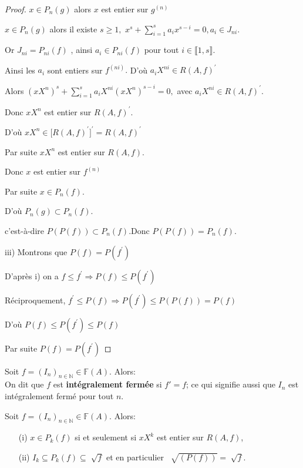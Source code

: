 \begin{proof}
	$x\in P_{n}(g)$ alors $x$ est entier sur $g^{(n)}$
	
	$x\in P_{n}(g)$ alors il existe $s\geq 1,$ $x^{s}+\sum\limits_{i=1}^{s}a_{i}x^{s-i}=0,a_{i}\in J_{ni}$.
	
	Or $J_{ni}=P_{ni}(f)$ , ainsi $a_{i}\in P_{ni}(f)$ pour tout $i\in \llbracket 1, s \rrbracket.$
	
	Ainsi les $a_{i}$ sont entiers sur $f^{(ni)}.$ D'où $a_{i}X^{ni}\in R(A,f)^{\prime }$
	
	Alors $(xX^{n})^{s}+\sum\limits_{i=1}^{s}a_{i}X^{ni}(xX^{n})^{s-i}=0,$ avec 
	$a_{i}X^{ni}\in R(A,f)^{\prime }$.
	
	Donc $xX^{n}$ est entier sur $R(A,f)^{\prime }$.
	
	D'où $xX^{n}\in \lbrack R(A,f)^{\prime }]^{\prime }=R(A,f)^{\prime }$
	
	Par suite $xX^{n}$ est entier sur $R(A,f)$.
	
	Donc $x$ est entier sur $f^{(n)}$
	
	Par suite $x\in P_{n}(f).$
	
	D'où $P_{n}(g)\subset P_{n}(f).$
	
	c'est-\`{a}-dire $P(P(f))\subset P_{n}(f).$Donc $P(P(f))=P_{n}(f).$
	
	
	
	iii) Montrons que $P(f)=P(f^{\prime })$
	
	D'après i) on a $f\leq f^{\prime }\Rightarrow P(f)\leq P(f^{\prime })$
	
	Réciproquement, $f^{\prime }\leq P(f)\Rightarrow P(f^{\prime })\leq
	P(P(f))=P(f)$
	
	D'où $P(f)\leq P(f^{\prime })\leq P(f)$
	
	Par suite $P(f)=P(f^{\prime })$
\end{proof}
\begin{madefinition}
Soit $f=(I_n)_{n \in \mathbb{N}} \in \mathbb{F}(A)$. Alors:\\
On dit que $f$ est \textbf{intégralement fermée} si $f'=f$; ce qui signifie aussi que $I_n$ est intégralement fermé pour tout $n$.
\end{madefinition}
\begin{maproposition}
	Soit $f=(I_n)_{n \in \mathbb{N}} \in \mathbb{F}(A)$. Alors:\\
	\begin{enumerate}
		\item[(i)] $x \in P_k(f)$ si et seulement si $xX^k$ est entier sur $R(A,f)$,
		\item[(ii)] $ I_k \subseteq P_k(f) \subseteq \sqrt[]{f}$ et en particulier $\ \sqrt[]{(P(f))} = \sqrt[]{f}$.
	\end{enumerate}
\end{maproposition}
